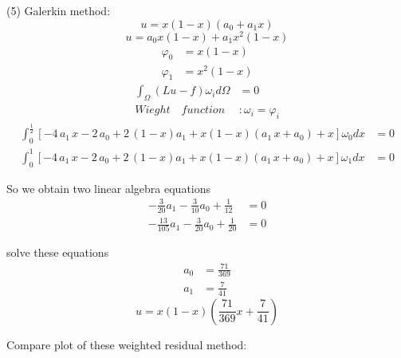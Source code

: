 \documentclass{article}%
\begin{document}
(5) Galerkin method:%
\[
u=x\left(  1-x\right)  \left(  a_{0}+a_{1}x\right)
\]%
\[
u=a_{0}x\left(  1-x\right)  +a_{1}x^{2}\left(  1-x\right)
\]%
\begin{align*}
\varphi_{0}  &  =x\left(  1-x\right) \\
\varphi_{1}  &  =x^{2}\left(  1-x\right)
\end{align*}%
\begin{align*}
\int_{\Omega}\left(  Lu-f\right)  \omega_{i}d\Omega &  =0\\
Wieght\quad function  &  :\omega_{i}=\varphi_{i}%
\end{align*}%
\begin{align*}
\int_{0}^{\frac{1}{2}}\left[  -4\,a_{1}\,x-2\,a_{0}+2\,\left(  1-x\right)
a_{1}+x\left(  1-x\right)  \left(  a_{1}\,x+a_{0}\right)  +x\right]
\omega_{0}dx  &  =0\\
\int_{0}^{1}\left[  -4\,a_{1}\,x-2\,a_{0}+2\,\left(  1-x\right)
a_{1}+x\left(  1-x\right)  \left(  a_{1}\,x+a_{0}\right)  +x\right]
\omega_{1}dx  &  =0
\end{align*}


So we obtain two linear algebra equations
\begin{align*}
-\frac{3}{20}a_{1}-\frac{3}{10}a_{0}+\frac{1}{12}  &  =0\\
-\frac{13}{105}a_{1}-\frac{3}{20}a_{0}+\frac{1}{20}  &  =0
\end{align*}


solve these equations%
\begin{align*}
a_{0}  &  =\frac{71}{369}\\
a_{1}  &  =\frac{7}{41}%
\end{align*}%
\[
u=x\left(  1-x\right)  \left(  \frac{71}{369}x+\frac{7}{41}\right)
\]


Compare plot of these weighted residual method:
\end{document}
